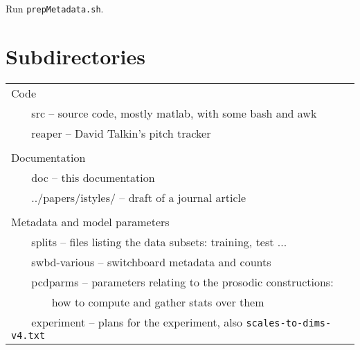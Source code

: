 \documentclass[11pt]{article}
\begin{document}
Run {\tt prepMetadata.sh}.

\section{Subdirectories}

\begin{tabular}{l}
Code \\
~~~ src -- source code, mostly matlab, with some bash and awk \\
~~~ reaper --  David Talkin's pitch tracker  \\
\\
Documentation \\
~~~ doc -- this documentation \\
~~~ ../papers/istyles/ -- draft of a journal article \\
\\
Metadata and model parameters  \\
~~~ splits -- files listing the data subsets: training, test ... \\
~~~ swbd-various -- switchboard metadata and counts \\
~~~ pcdparms -- parameters relating to the prosodic constructions: \\
~~~ ~~~ how to compute and gather stats over them \\
~~~ experiment -- plans for the experiment, also {\tt scales-to-dims-v4.txt} \\
\end{tabular}
\end{document}

